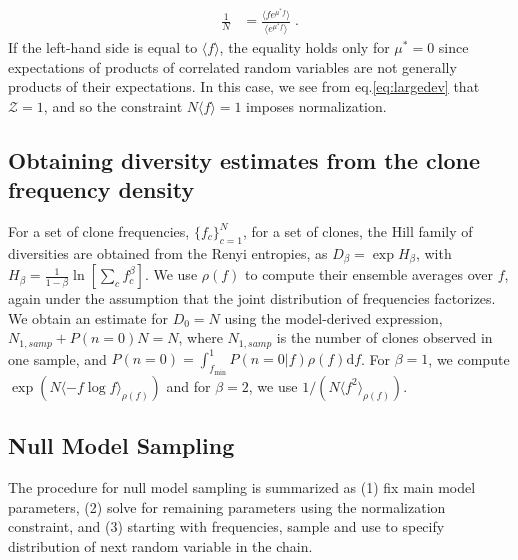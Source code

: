 \documentclass[letterpaper,english,prl,reprint,longbibliography]{revtex4-1} %
\begin{document}
\begin{align}
	\frac{1}{N}&=\frac{\langle f e^{\mu^* f}\rangle}{\langle e^{\mu^* f}\rangle}\;.
\end{align} 
If the left-hand side is equal to $\langle f\rangle$, the equality holds only for $\mu^*=0$ since expectations of products of correlated random variables are not generally products of their expectations. 
In this case, we see from eq.\ref{eq:largedev} that $\mathcal{Z}=1$, and so the constraint $N\langle f\rangle=1$ imposes normalization.
\subsection*{Obtaining diversity estimates from the clone frequency density}
For a set of clone frequencies, $\{f_c\}_{c=1}^{N}$, for a set of clones, the Hill family of diversities are obtained from the Renyi entropies, as $D_\beta=\exp H_\beta$, with $H_\beta=\frac{1}{1-\beta}\ln \left[ \sum_c f_c^{\beta}\right]$. We use $\rho(f)$ to compute their ensemble averages over $f$, again under the assumption that the joint distribution of frequencies factorizes. We obtain an estimate for $D_0=N$ using the model-derived expression, $N_{1,samp}+P(n=0)N=N$, where $N_{1,samp}$ is the number of clones observed in one sample, and $P(n=0)=\int_{f_{\textrm{min}}}^1 P(n=0|f)\rho(f)\textrm{d}f$. For $\beta=1$, we compute $\exp (N\langle -f\log f \rangle_{\rho(f)})$ and for $\beta=2$, we use $1/\left(N\langle f^2\rangle_{\rho(f)}\right)$.

\subsection*{Null Model Sampling}
The procedure for null model sampling is summarized as (1) fix main model parameters, (2) solve for remaining parameters using the normalization constraint, and (3) starting with frequencies, sample and use to specify distribution of next random variable in the chain.
\end{document}
